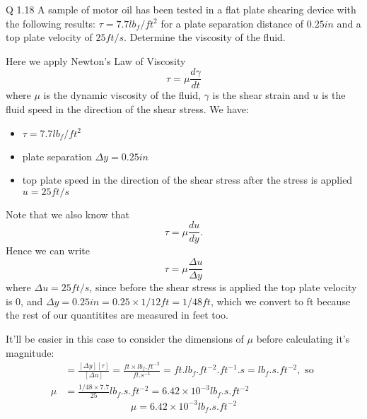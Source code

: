 \begin{question}
  Q 1.18 A sample of motor oil has been tested in a flat plate shearing device with the following results: $\tau = 7.7 \si{lb_{f}/ft^2}$ for a plate separation distance of $0.25 \si{in}$ and a top plate velocity of $25 \si{ft/s}$. Determine the viscosity of the fluid.
\end{question}

\begin{solution}
  Here we apply Newton's Law of Viscosity
  \begin{equation}\label{eq:newton-viscosity}
    \tau = \mu \frac{ d \gamma }{ dt }
  \end{equation}
  where $\mu$ is the dynamic viscosity of the fluid, $\gamma$ is the shear strain and $u$ is the fluid speed in the direction of the shear stress. We have:

  \begin{itemize}
    \item $\tau = 7.7 \si{lb_{f}/ft^2}$
    \item plate separation $\Delta y = 0.25 \si{in}$
    \item top plate speed in the direction of the shear stress after the stress is applied $u = 25 \si{ft/s}$
  \end{itemize}

  Note that we also know that
  \begin{equation}
    \tau = \mu \frac{ du }{ dy }.
  \end{equation}
  Hence we can write
  \begin{equation}
    \tau = \mu \frac{ \Delta u }{\Delta y}
  \end{equation}
  where $\Delta u = 25 \si{ft/s}$, since before the shear stress is applied the top plate velocity is $0$, and $\Delta y = 0.25 \si{in} = 0.25 \times 1/12 \si{ft} = 1/48 \si{ft}$, which we convert to \si{ft} because the rest of our quantitites are measured in feet too.

  It'll be easier in this case to consider the dimensions of $\mu$ before calculating it's magnitude:
  \begin{align*}
    [\mu] &= \frac{[\Delta y][\tau]}{[\Delta u]} = \frac{ \si{ft} \times \si{lb_f.ft^{-2}} }{ \si{ ft.s^{-1}} }
      = \si{ft.lb_f.ft^{-2}.ft^{-1}.s} = \si{lb_f.s.ft^{-2}}, \text{ so } \\
    \mu &= \frac{ 1/48 \times 7.7 }{25} \si{lb_f.s.ft^{-2}} = 6.42 \times 10^{-3} \si{lb_f.s.ft^{-2}}
  \end{align*}
  \begin{equation*}
    \boxed{\mu = 6.42 \times 10^{-3} \si{lb_f.s.ft^{-2}}}
  \end{equation*}
\end{solution}


